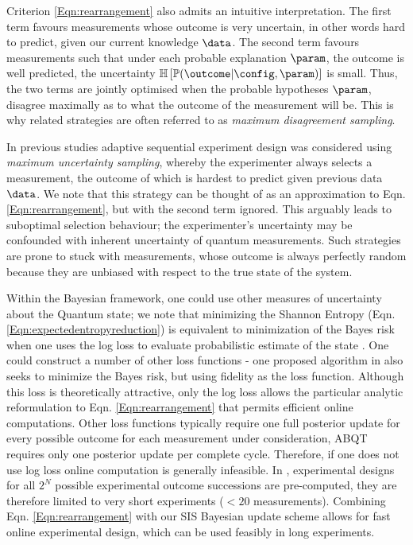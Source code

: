 Criterion \eqref{Eqn:rearrangement}  also admits an intuitive interpretation. The first term favours measurements whose outcome is very uncertain, in other words hard to predict, given our current knowledge $\data$. The second term favours measurements such that under each probable explanation $\param$, the outcome is well predicted, the uncertainty $\mathbb{H}\left[ \mathbb{P}(\outcome|\config,\param) \right]$ is small. Thus, the two terms are jointly optimised when the probable hypotheses $\param$, disagree maximally as to what the outcome of the measurement will be. This is why related strategies are often referred to as \emph{maximum disagreement sampling}.

In previous studies \citep{SelfLearning} adaptive sequential experiment design was considered using \emph{maximum uncertainty sampling}, whereby the experimenter always selects a measurement, the outcome of which is hardest to predict given previous data $\data$. We note that this strategy can be thought of as an approximation to Eqn. \eqref{Eqn:rearrangement}, but with the second term ignored. This arguably leads to suboptimal selection behaviour; the experimenter's uncertainty may be confounded with inherent uncertainty of quantum measurements. Such strategies are prone to stuck with measurements, whose outcome is always perfectly random because they are unbiased with respect to the true state of the system.

Within the Bayesian framework, one could use other measures of uncertainty about the Quantum state; we note that minimizing the Shannon Entropy (Eqn. \eqref{Eqn:expectedentropyreduction}) is equivalent to minimization of the Bayes risk when one uses the log loss to evaluate probabilistic estimate of the state \citep{Dawid2007}. One could construct a number of other loss functions - one proposed algorithm in \citep{SelfLearning} also seeks to minimize the Bayes risk, but using fidelity as the loss function. Although this loss is theoretically attractive, only the log loss allows the particular analytic reformulation to Eqn. \eqref{Eqn:rearrangement} that permits efficient online computations. Other loss functions typically require one full posterior update for every possible outcome for each measurement under consideration, ABQT requires only one posterior update per complete cycle. Therefore, if one does not use log loss online computation is generally infeasible. In \citep{SelfLearningExperimental}, experimental designs for all $2^N$ possible experimental outcome successions are pre-computed, they are therefore limited to very short experiments ($< 20$ measurements). Combining Eqn. \eqref{Eqn:rearrangement} with our SIS Bayesian update scheme allows for fast online experimental design, which can be used feasibly in long experiments.

